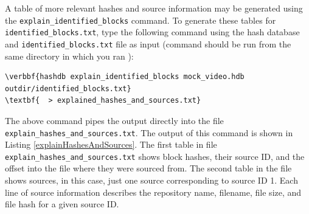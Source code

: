 \documentclass[11pt,fleqn]{article} %
\begin{document}
A table of more relevant hashes and source information may be generated using the \verb+explain_identified_blocks+ command.
To generate these tables for \texttt{identified\_blocks.txt}, type the following command using the hash database and \texttt{identified\_blocks.txt} file as input (command should be run from the same directory in which you ran \bulk):
\begin{Verbatim}[commandchars=\\\{\}]
\verbbf{hashdb explain_identified_blocks mock_video.hdb outdir/identified_blocks.txt} 
\textbf{  > explained_hashes_and_sources.txt}
\end{Verbatim}
The above command pipes the output directly into the file \texttt{explain\_hashes\_and\_sources.txt}.
The output of this command is shown in Listing \ref{explainHashesAndSources}.
The first table in file \texttt{explain\_hashes\_and\_sources.txt}
shows block hashes, their source ID, and the offset into the file where they were sourced from.
The second table in the file shows sources, in this case, just one source corresponding to source ID 1.
Each line of source information describes
the repository name, filename, file size, and file hash for a given source ID.\\
\end{document}
